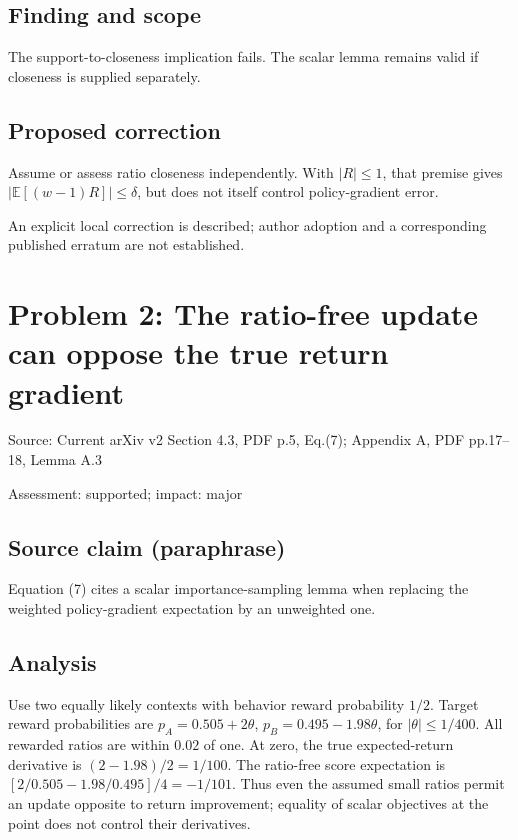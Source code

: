 \documentclass[11pt]{article}
\begin{document}
\subsection*{Finding and scope}

The support-to-closeness implication fails. The scalar lemma remains valid if closeness is supplied separately.

\subsection*{Proposed correction}

Assume or assess ratio closeness independently. With \(|R|\leq1\), that premise gives \(|\mathbb E[(w-1)R]|\leq\delta\), but does not itself control policy-gradient error.

An explicit local correction is described; author adoption and a corresponding published erratum are not established.

\section*{Problem 2: The ratio-free update can oppose the true return gradient}

Source: Current arXiv v2 Section 4.3, PDF p.5, Eq.(7); Appendix A, PDF pp.17–18, Lemma A.3

Assessment: supported; impact: major

\subsection*{Source claim (paraphrase)}

Equation (7) cites a scalar importance-sampling lemma when replacing the weighted policy-gradient expectation by an unweighted one.

\subsection*{Analysis}

Use two equally likely contexts with behavior reward probability \(1/2\). Target reward probabilities are \(p_A=0.505+2\theta\), \(p_B=0.495-1.98\theta\), for \(|\theta|\leq1/400\). All rewarded ratios are within \(0.02\) of one. At zero, the true expected-return derivative is \((2-1.98)/2=1/100\). The ratio-free score expectation is \([2/0.505-1.98/0.495]/4=-1/101\). Thus even the assumed small ratios permit an update opposite to return improvement; equality of scalar objectives at the point does not control their derivatives.
\end{document}
